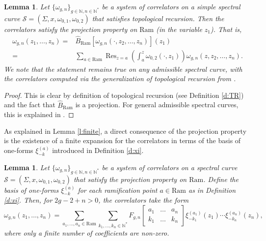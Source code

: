 \documentclass[reqno,oneside,11pt]{amsart}
\theoremstyle{plain}
\newtheorem{lemma}[theorem]{Lemma}
\theoremstyle{definition}
\theoremstyle{remark}
\numberwithin{equation}{section}
\DeclareMathOperator*{\Res}{Res}
\newcommand{\Ra}{\text{Ram}}
\begin{document}
\begin{lemma}
Let $\{\omega_{g,n} \}_{g \in \mathbb{N}, n \in \mathbb{N}^* }$ be a system of correlators on a simple spectral curve $\mathcal{S} = (\Sigma,x,\omega_{0,1}, \omega_{0,2})$ that satisfies topological recursion. Then the correlators satisfy the projection property on $\Ra$ (in the variable $z_1$). That is,
\begin{align}
\omega_{g,n}(z_1, \ldots, z_n) =&  \hat{B}_{\Ra}[ \omega_{g,n}(\cdot, z_2, \ldots, z_n)](z_1)\\
=& \sum_{a \in \Ra} \Res_{z=a} \left( \int^z_a \omega_{0,2}(\cdot, z_1) \right) \omega_{g,n}(z, z_2, \ldots, z_n).
\end{align}
We note that the statement remains true on any admissible spectral curve, with the correlators computed via the generalization of topological recursion from \cite{BE13}.
\end{lemma}

\begin{proof}
This is clear by definition of topological recursion (see Definition \ref{d:TR}) and the fact that $\hat{B}_{\Ra}$ is a projection. For general admissible spectral curves, this is explained in \cite{BBCKS23}.
\end{proof}

As explained in Lemma \ref{l:finite}, a direct consequence of the projection property is the existence of a finite expansion for the correlators in terms of the basis of one-forms $ \xi_{-k}^{(a)}$ introduced in Definition \ref{d:xi}.

\begin{lemma}
Let $\{\omega_{g,n} \}_{g \in \mathbb{N}, n \in \mathbb{N}^* }$ be a system of correlators on a spectral curve $\mathcal{S} = (\Sigma,x,\omega_{0,1}, \omega_{0,2})$ that satisfy the projection property on $\Ra$. Define the basis of one-forms $ \xi_{-k}^{(a)}$ for each ramification point $a \in \Ra$ as in Definition \ref{d:xi}. Then, for $2g-2+n>0$, the correlators take the form
\begin{equation}\label{eq:expansion}
\omega_{g,n}(z_1,\ldots,z_n) = \sum_{a_1, \ldots, a_n \in \Ra} \sum_{k_1, \ldots, k_n \in \mathbb{N}^*} F_{g,n} \begin{bmatrix} a_1 & \ldots & a_n \\ k_1 & \ldots & k_n \end{bmatrix} \xi_{-k_1}^{(a_1)}(z_1) \cdots  \xi_{-k_n}^{(a_n)}(z_n),
\end{equation}
where only a finite number of coefficients are non-zero.
\end{lemma}
\end{document}
